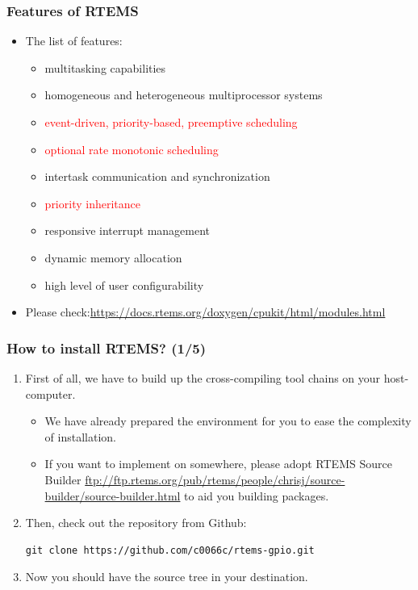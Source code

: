 \documentclass[t]{beamer}
\newcommand{\red}[1]{\textcolor{red}{#1}}
\begin{document}
\begin{frame}
\frametitle{Features of RTEMS}
\begin{itemize}
\item    The list of features:
\begin{itemize}

\item    multitasking capabilities
\item    homogeneous and heterogeneous multiprocessor systems
\item    \red{event-driven, priority-based, preemptive scheduling}
\item    \red{optional rate monotonic scheduling}
\item    intertask communication and synchronization
\item    \red{priority inheritance}
\item    responsive interrupt management
\item    dynamic memory allocation
\item    high level of user configurability
\end{itemize}



\item Please check:\newline \url{https://docs.rtems.org/doxygen/cpukit/html/modules.html}
\end{itemize}
\end{frame}

\begin{frame}[fragile]
\frametitle{How to install RTEMS? (1/5)}
\begin{enumerate}

\item First of all, we have to build up the cross-compiling tool chains on your host-computer.
\begin{itemize}
\item We have already prepared the environment for you to ease the complexity of installation.
\item If you want to implement on somewhere, please adopt RTEMS Source Builder \url{ftp://ftp.rtems.org/pub/rtems/people/chrisj/source-builder/source-builder.html} to aid you building packages.
\end{itemize}
\item Then, check out the repository from Github:
\begin{verbatim}
git clone https://github.com/c0066c/rtems-gpio.git
\end{verbatim}
\item Now you should have the source tree in your destination.
\end{enumerate}
\end{frame}
\end{document}
